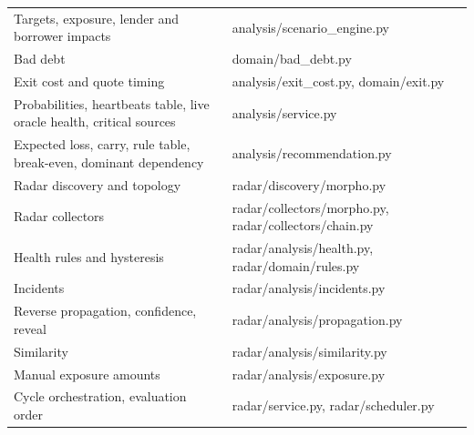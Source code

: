 \documentclass[11pt,a4paper]{article}
\newcommand{\src}[1]{\textsf{\small #1}}
\begin{document}
\begin{longtable}{@{}L{7.4cm}L{7.6cm}@{}}
Targets, exposure, lender and borrower impacts & \src{analysis/scenario\_engine.py} \\
Bad debt & \src{domain/bad\_debt.py} \\
Exit cost and quote timing & \src{analysis/exit\_cost.py}, \src{domain/exit.py} \\
Probabilities, heartbeats table, live oracle health, critical sources & \src{analysis/service.py} \\
Expected loss, carry, rule table, break-even, dominant dependency & \src{analysis/recommendation.py} \\
Radar discovery and topology & \src{radar/discovery/morpho.py} \\
Radar collectors & \src{radar/collectors/morpho.py}, \src{radar/collectors/chain.py} \\
Health rules and hysteresis & \src{radar/analysis/health.py}, \src{radar/domain/rules.py} \\
Incidents & \src{radar/analysis/incidents.py} \\
Reverse propagation, confidence, reveal & \src{radar/analysis/propagation.py} \\
Similarity & \src{radar/analysis/similarity.py} \\
Manual exposure amounts & \src{radar/analysis/exposure.py} \\
Cycle orchestration, evaluation order & \src{radar/service.py}, \src{radar/scheduler.py} \\
\end{longtable}
\endgroup
\end{document}
